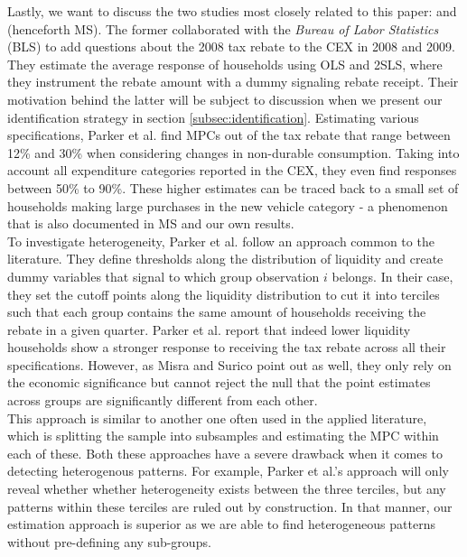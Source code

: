 Lastly, we want to discuss the two studies most closely related to this paper: \cite{parkeretal_2013} and \cite{misrasurico_2014} (henceforth MS). The former collaborated with the \textit{Bureau of Labor Statistics} (BLS) to add questions about the 2008 tax rebate to the CEX in 2008 and 2009. They estimate the average response of households using OLS and 2SLS, where they instrument the rebate amount with a dummy signaling rebate receipt. Their motivation behind the latter will be subject to discussion when we present our identification strategy in section \ref{subsec:identification}. Estimating various specifications, Parker et al. find MPCs out of the tax rebate that range between 12\% and 30\% when considering changes in non-durable consumption. Taking into account all expenditure categories reported in the CEX, they even find responses between 50\% to 90\%. These higher estimates can be traced back to a small set of households making large purchases in the new vehicle category - a phenomenon that is also documented in MS and our own results. \\
To investigate heterogeneity, Parker et al. follow an approach common to the literature. They define thresholds along the distribution of liquidity and create dummy variables that signal to which group observation $i$ belongs. In their case, they set the cutoff points along the liquidity distribution to cut it into terciles such that each group contains the same amount of households receiving the rebate in a given quarter. Parker et al. report that indeed lower liquidity households show a stronger response to receiving the tax rebate across all their specifications. However, as Misra and Surico point out as well, they only rely on the economic significance but cannot reject the null that the point estimates across groups are significantly different from each other. \\
This approach is similar to another one often used in the applied literature, which is splitting the sample into subsamples and estimating the MPC within each of these. Both these approaches have a severe drawback when it comes to detecting heterogenous patterns. For example, Parker et al.'s approach will only reveal whether whether heterogeneity exists between the three terciles, but any patterns within these terciles are ruled out by construction. In that manner, our estimation approach is superior as we are able to find heterogeneous patterns without pre-defining any sub-groups. \\
